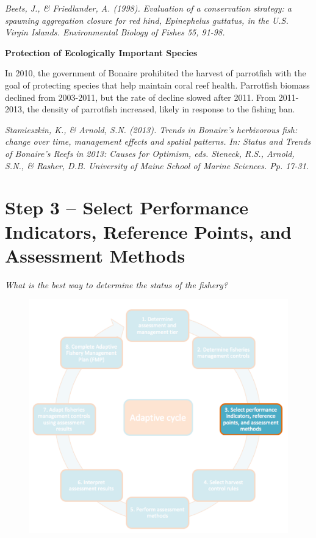 \documentclass[]{book}
\begin{document}
\emph{Beets, J., \& Friedlander, A. (1998). Evaluation of a conservation
strategy: a spawning aggregation closure for red hind, Epinephelus
guttatus, in the U.S. Virgin Islands. Environmental Biology of Fishes
55, 91-98.}

\textbf{Protection of Ecologically Important Species}

In 2010, the government of Bonaire prohibited the harvest of parrotfish
with the goal of protecting species that help maintain coral reef
health. Parrotfish biomass declined from 2003-2011, but the rate of
decline slowed after 2011. From 2011-2013, the density of parrotfish
increased, likely in response to the fishing ban.

\emph{Stamieszkin, K., \& Arnold, S.N. (2013). Trends in Bonaire's
herbivorous fish: change over time, management effects and spatial
patterns. In: Status and Trends of Bonaire's Reefs in 2013: Causes for
Optimism, eds. Steneck, R.S., Arnold, S.N., \& Rasher, D.B. University
of Maine School of Marine Sciences. Pp. 17-31.}

\chapter{Step 3 -- Select Performance Indicators, Reference Points, and
Assessment Methods}\label{Step3}

\emph{What is the best way to determine the status of the fishery?}

\begin{figure}
\centering
\includegraphics{myMediaFolder/media/Step3.png}
\caption{}
\end{figure}
\end{document}

